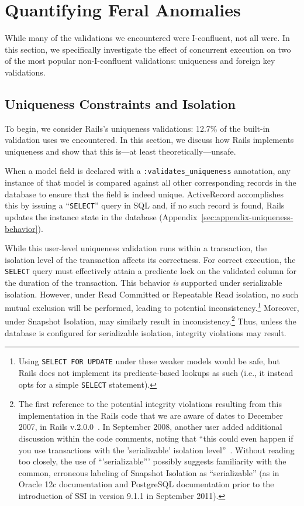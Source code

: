 
\section{Quantifying Feral Anomalies}
\label{sec:evaluation}

While many of the validations we encountered were I-confluent,
not all were. In this section, we specifically investigate the effect
of concurrent execution on two of the most popular non-I-confluent
validations: uniqueness and foreign key validations.

\subsection{Uniqueness Constraints and Isolation}

To begin, we consider Rails's uniqueness validations: 12.7\% of the
built-in validation uses we encountered. In this section, we discuss
how Rails implements uniqueness and show that this is---at least
theoretically---unsafe.

When a model field is declared with a \texttt{:validates\_uniqueness}
annotation, any instance of that model is compared against all other
corresponding records in the database to ensure that the field is
indeed unique. ActiveRecord accomplishes this by issuing a
``\texttt{SELECT}'' query in SQL and, if no such record is found,
Rails updates the instance state in the database
(Appendix~\ref{sec:appendix-uniqueness-behavior}).

While this user-level uniqueness validation runs within a transaction,
the isolation level of the transaction affects its
correctness. For correct execution, the \texttt{SELECT} query must
effectively attain a predicate lock on the validated column for the
duration of the transaction. This behavior \textit{is} supported under
serializable isolation. However, under Read Committed or Repeatable
Read isolation, no such mutual exclusion will be performed, leading to
potential inconsistency.\footnote{Using \texttt{SELECT FOR UPDATE}
  under these weaker models would be safe, but Rails does not
  implement its predicate-based lookups as such (i.e., it instead opts
  for a simple \texttt{SELECT} statement).}  Moreover, under Snapshot Isolation,
may similarly result in
inconsistency.\footnote{The first reference to the potential integrity
  violations resulting from this implementation in the Rails code that
  we are aware of dates to December 2007, in Rails
  v.2.0.0~\cite{code-unique-race-one}.  In September 2008, another
  user added additional discussion within the code comments, noting
  that ``this could even happen if you use transactions with the
  'serializable' isolation
  level''~\cite{code-unique-race-two}. Without reading too closely,
  the use of ``'serializable''' possibly suggests familiarity with the
  common, erroneous labeling of Snapshot Isolation as ``serializable''
  (as in Oracle 12c documentation and PostgreSQL documentation prior
  to the introduction of SSI in version 9.1.1 in September
  2011)\label{fn:si-rails}. } Thus, unless the database is configured
for serializable isolation, integrity violations may result.

